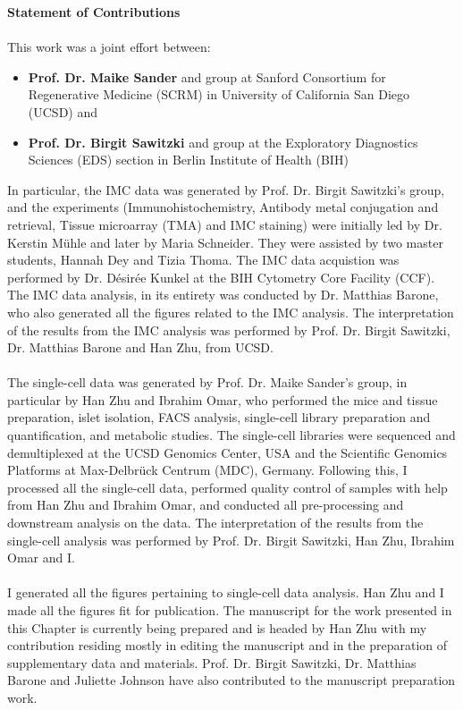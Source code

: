\begin{Comment2}\label{contr:chapter2}
\hspace{-3mm}\textbf{Statement of Contributions} \\\\
This work was a joint effort between:
\begin{itemize}
  \item \textbf{Prof. Dr. Maike Sander} and group at Sanford Consortium for Regenerative Medicine (SCRM) in University of California San Diego (UCSD)  and
  \item  \textbf{Prof. Dr. Birgit Sawitzki} and group at the Exploratory Diagnostics Sciences (EDS) section in Berlin Institute of Health (BIH)
\end{itemize}

In particular, the IMC data was generated by Prof. Dr. Birgit Sawitzki's group, and the experiments (Immunohistochemistry, Antibody metal conjugation and retrieval, Tissue microarray (TMA) and IMC staining) were initially led by Dr. Kerstin Mühle and later by Maria Schneider. They were assisted by two master students, Hannah Dey and Tizia Thoma. The IMC data acquistion was performed by Dr. Désirée Kunkel at the BIH Cytometry Core Facility (CCF). The IMC data analysis, in its entirety was conducted by Dr. Matthias Barone, who also generated all the figures related to the IMC analysis. The interpretation of the results from the IMC analysis was performed by Prof. Dr. Birgit Sawitzki, Dr. Matthias Barone and Han Zhu, from UCSD.\\\\
The single-cell data was generated by Prof. Dr. Maike Sander's group, in particular by Han Zhu and Ibrahim Omar, who performed the mice and tissue preparation, islet isolation, FACS analysis, single-cell library preparation and quantification, and metabolic studies. The single-cell libraries were sequenced and demultiplexed at the UCSD Genomics Center, USA and the Scientific Genomics Platforms at Max-Delbrück Centrum (MDC), Germany. Following this, I processed all the single-cell data, performed quality control of samples with help from Han Zhu and Ibrahim Omar, and conducted all pre-processing and downstream analysis on the data. The interpretation of the results from the single-cell analysis was performed by Prof. Dr. Birgit Sawitzki, Han Zhu, Ibrahim Omar and I.\\\\
I generated all the figures pertaining to single-cell data analysis. Han Zhu and I made all the figures fit for publication. The manuscript for the work presented in this Chapter is currently being prepared and is headed by Han Zhu with my contribution residing mostly in editing the manuscript and in the preparation of supplementary data and materials. Prof. Dr. Birgit Sawitzki, Dr. Matthias Barone and Juliette Johnson have also contributed to the manuscript preparation work.
\end{Comment2}

